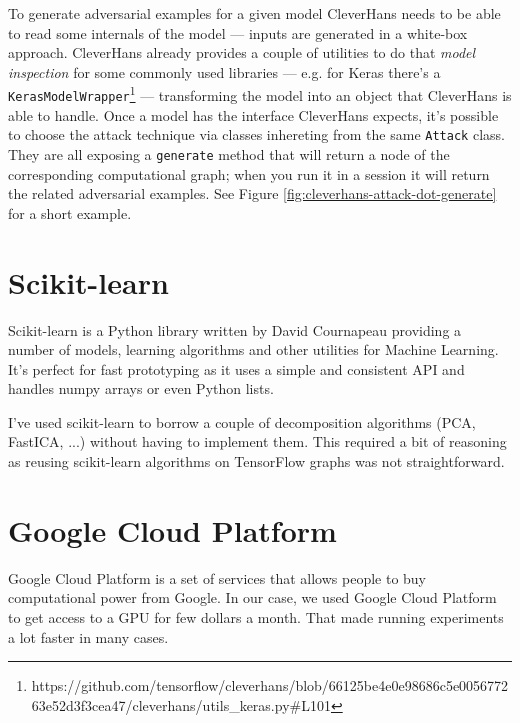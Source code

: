 To generate adversarial examples for a given model CleverHans needs to
be able to read some internals of the model --- inputs are generated in
a white-box approach. CleverHans already provides a couple of utilities
to do that \emph{model inspection} for some commonly used libraries ---
e.g. for Keras there's a
\texttt{KerasModelWrapper}\footnote{https://github.com/tensorflow/cleverhans/blob/66125be4e0e98686c5e005677263e52d3f3cea47/cleverhans/utils\_keras.py\#L101}
--- transforming the model into an object that CleverHans is able to
handle. Once a model has the interface CleverHans expects, it's
possible to choose the attack technique via classes inhereting from the
same \texttt{Attack} class. They are all exposing a \texttt{generate}
method that will return a node of the corresponding computational
graph; when you run it in a session it will return the related
adversarial examples. See Figure
\ref{fig:cleverhans-attack-dot-generate} for a short example.

\section{Scikit-learn}
\label{sec:sklearn}

Scikit-learn is a Python library written by David Cournapeau
providing a number of models, learning algorithms and other
utilities for Machine Learning. It's perfect for fast
prototyping as it uses a simple and consistent API and
handles numpy arrays or even Python lists.

I've used scikit-learn to borrow a couple of decomposition
algorithms (PCA, FastICA, ...) without having to implement
them. This required a bit of reasoning as reusing
scikit-learn algorithms on TensorFlow graphs was not
straightforward.

\section{Google Cloud Platform}
\label{sec:google-cloud-platform}

Google Cloud Platform is a set of services that allows
people to buy computational power from Google. In our case,
we used Google Cloud Platform to get access to a GPU for few
dollars a month. That made running experiments a lot faster
in many cases.
